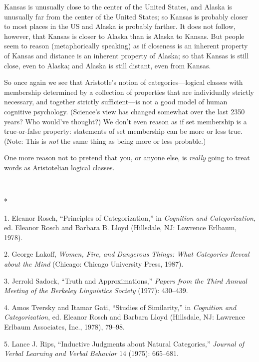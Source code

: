 {
 Kansas is unusually close to the center of the United States, and
Alaska is unusually far from the center of the United States; so Kansas
is probably closer to most places in the US and Alaska is probably
farther. It does not follow, however, that Kansas is closer to Alaska
than is Alaska to Kansas. But people seem to reason (metaphorically
speaking) as if closeness is an inherent property of Kansas and
distance is an inherent property of Alaska; so that Kansas is still
close, even to Alaska; and Alaska is still distant, even from Kansas.}

{
 So once again we see that Aristotle's notion of
categories---logical classes with membership determined by a collection
of properties that are individually strictly necessary, and together
strictly sufficient---is not a good model of human cognitive
psychology. (Science's view has changed somewhat over
the last 2350 years? Who would've thought?) We
don't even reason as if set membership is a
true-or-false property: statements of set membership can be more or
less true. (Note: This is \textit{not} the same thing as being more or
less probable.)}

{
 One more reason not to pretend that you, or anyone else, is
\textit{really} going to treat words as Aristotelian logical classes.}

{\centering
 \ ~
\par}

{\centering
 *
\par}


\bigskip

{
 1. Eleanor Rosch, ``Principles of
Categorization,'' in \textit{Cognition and
Categorization}, ed. Eleanor Rosch and Barbara B. Lloyd (Hillsdale, NJ:
Lawrence Erlbaum, 1978).}

{
 2. George Lakoff, \textit{Women, Fire, and Dangerous Things: What
Categories Reveal about the Mind} (Chicago: Chicago University Press,
1987).}

{
 3. Jerrold Sadock, ``Truth and
Approximations,'' \textit{Papers from the Third
Annual Meeting of the Berkeley Linguistics Society} (1977): 430--439.}

{
 4. Amos Tversky and Itamar Gati, ``Studies of
Similarity,'' in \textit{Cognition and
Categorization}, ed. Eleanor Rosch and Barbara Lloyd (Hillsdale, NJ:
Lawrence Erlbaum Associates, Inc., 1978), 79--98.}

{
 5. Lance J. Rips, ``Inductive Judgments about
Natural Categories,'' \textit{Journal of Verbal
Learning and Verbal Behavior} 14 (1975): 665--681.}

